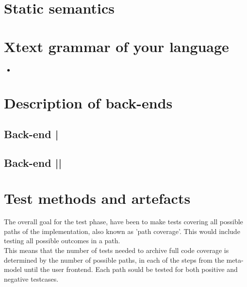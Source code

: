 \documentclass[paper=a4, fontsize=11pt]{scrartcl} %
\numberwithin{equation}{section} %
\numberwithin{figure}{section} %
\numberwithin{table}{section} %
\newcommand{\java}[2]{
\begin{itemize}
\item[]
\end{itemize}
}
\begin{document}
\section{Static semantics}

\section{Xtext grammar of your language}
\java{../configproject/xtext/org.xtext.example.smdpdsl/src/org/xtext/example/mydsl/SmdpDsl.xtext}{static}

\section{Description of back-ends}
\subsection{Back-end |}
\subsection{Back-end ||}

\section{Test methods and artefacts}
The overall goal for the test phase, have been to make tests covering all possible paths of the implementation, also known as 'path coverage'. This would include testing all possible outcomes in a path.\\ 
This means that the number of tests needed to archive full code coverage is determined by the number of possible paths, in each of the steps from the meta-model until the user frontend. Each path sould be tested for both positive and negative testcases.\\
\end{document}
